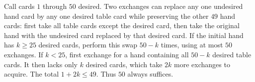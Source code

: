 Call cards $1$ through $50$ desired. Two exchanges can replace any one undesired hand card by any one desired table card while preserving the other $49$ hand cards: first take all table cards except the desired card, then take the original hand with the undesired card replaced by that desired card. If the initial hand has $k\ge25$ desired cards, perform this swap $50-k$ times, using at most $50$ exchanges. If $k<25$, first exchange for a hand containing all $50-k$ desired table cards. It then lacks only $k$ desired cards, which take $2k$ more exchanges to acquire. The total $1+2k\le49$. Thus $50$ always suffices.
